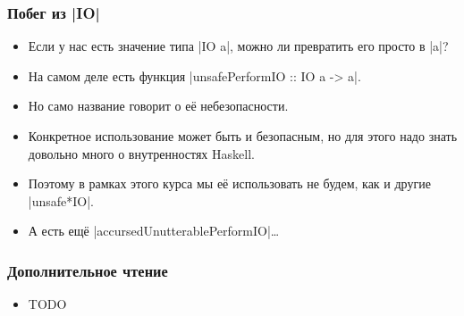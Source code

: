 \documentclass[11pt]{beamer}
\begin{document}
\begin{frame}[fragile]
\frametitle{Побег из \haskinline|IO|}
\begin{itemize}
    \item Если у нас есть значение типа \haskinline|IO a|, можно ли превратить его просто в \haskinline|a|?
    \pause
    \item На самом деле есть функция \haskinline|unsafePerformIO :: IO a -> a|.
    \item Но само название говорит о её небезопасности.
    \item Конкретное использование может быть и безопасным, но для этого надо знать довольно много о внутренностях Haskell.
    \pause
    \item Поэтому в рамках этого курса мы её использовать не будем, как и другие \haskinline|unsafe*IO|.
    \item А есть ещё \haskinline|accursedUnutterablePerformIO|\ldots
\end{itemize}
\end{frame}

\begin{frame}[fragile]
\frametitle{Дополнительное чтение}
\begin{itemize}
    \item TODO
\end{itemize}
\end{frame}
\end{document}
